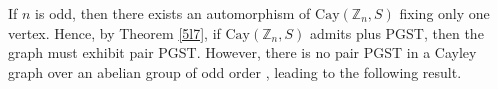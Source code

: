 \documentclass[12pt,a4paper]{article}
\newtheorem{lem}{Lemma}
\newtheorem{rem}{Remark}
\def \e {{\bf e}}
\def \e {{\mathbf e}}
\newcommand{\ob}[1]{\left(#1\right)}
\begin{document}
 
 If $n$ is odd, then there exists an automorphism of $\text{Cay}(\mathbb{Z}_n, S)$ fixing only one vertex. Hence, by Theorem \ref{5l7}, if $\text{Cay}(\mathbb{Z}_n, S)$ admits plus PGST, then the graph must exhibit pair PGST. However, there is no pair PGST in a Cayley graph over an abelian group of odd order \cite [Theorem 10]{pal10}, leading to the following result.   
\end{document}
